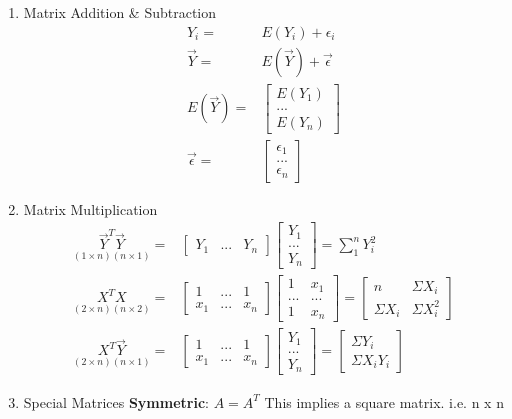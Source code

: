 \documentclass[11pt]{article}
\begin{document}
\begin{enumerate}
\item Matrix Addition \& Subtraction
\label{sec:org6f6e17d}
\begin{equation}
\begin{split}
Y_i = & E(Y_i) + \epsilon_i\\
\vec{Y} = & E(\vec{Y}) + \vec{\epsilon}\\
E(\vec{Y}) = & \begin{bmatrix}
E(Y_1)\\
...\\
E(Y_n)
\end{bmatrix}\\
\vec{\epsilon{}} = & \begin{bmatrix}
\epsilon_1\\
...\\
\epsilon_n
\end{bmatrix}
\end{split}
\end{equation}

\item Matrix Multiplication
\label{sec:orgf4f0194}
\begin{equation}
\begin{split}
\underset{(1 \times n)(n \times 1)}{\vec{Y}^T \vec{Y}} = & \begin{bmatrix}
Y_1 & ... & Y_n
\end{bmatrix}\begin{bmatrix}
Y_1\\
...\\
Y_n
\end{bmatrix} = \sum_{1}^{n}Y_i^2\\
\underset{(2 \times n)(n \times 2)}{X^T X} = & \begin{bmatrix}
1 & ... & 1\\
x_1 & ... & x_n
\end{bmatrix} \begin{bmatrix}
1 & x_1\\
... & ...\\
1 & x_n
\end{bmatrix} = \begin{bmatrix}
n & \Sigma X_i\\
\Sigma X_i & \Sigma X_i^2
\end{bmatrix}\\
\underset{(2 \times n)(n \times 1)}{X^T \vec{Y}} = & \begin{bmatrix}
1 & ... & 1\\
x_1 & ... & x_n
\end{bmatrix} \begin{bmatrix}
Y_1\\
...\\
Y_n
\end{bmatrix} = \begin{bmatrix}
\Sigma Y_i\\
\Sigma X_iY_i
\end{bmatrix}
\end{split}
\end{equation}
\item Special Matrices
\label{sec:org8c9855d}
\textbf{Symmetric}: \(A = A^T\)
This implies a square matrix. i.e. n x n


\end{enumerate}
\end{document}
